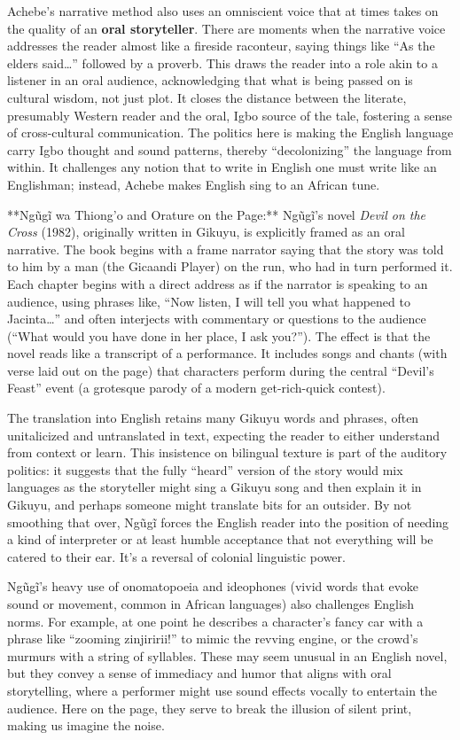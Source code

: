 \documentclass[12pt]{report}
\begin{document}
Achebe’s narrative method also uses an omniscient voice that at times takes on the quality of an \textbf{oral storyteller}. There are moments when the narrative voice addresses the reader almost like a fireside raconteur, saying things like “As the elders said…” followed by a proverb. This draws the reader into a role akin to a listener in an oral audience, acknowledging that what is being passed on is cultural wisdom, not just plot. It closes the distance between the literate, presumably Western reader and the oral, Igbo source of the tale, fostering a sense of cross-cultural communication. The politics here is making the English language carry Igbo thought and sound patterns, thereby “decolonizing” the language from within. It challenges any notion that to write in English one must write like an Englishman; instead, Achebe makes English sing to an African tune.

**Ngũgĩ wa Thiong’o and Orature on the Page:** Ngũgĩ’s novel \textit{Devil on the Cross} (1982), originally written in Gikuyu, is explicitly framed as an oral narrative. The book begins with a frame narrator saying that the story was told to him by a man (the Gicaandi Player) on the run, who had in turn performed it. Each chapter begins with a direct address as if the narrator is speaking to an audience, using phrases like, “Now listen, I will tell you what happened to Jacinta…” and often interjects with commentary or questions to the audience (“What would you have done in her place, I ask you?”). The effect is that the novel reads like a transcript of a performance. It includes songs and chants (with verse laid out on the page) that characters perform during the central “Devil’s Feast” event (a grotesque parody of a modern get-rich-quick contest). 

The translation into English retains many Gikuyu words and phrases, often unitalicized and untranslated in text, expecting the reader to either understand from context or learn. This insistence on bilingual texture is part of the auditory politics: it suggests that the fully “heard” version of the story would mix languages as the storyteller might sing a Gikuyu song and then explain it in Gikuyu, and perhaps someone might translate bits for an outsider. By not smoothing that over, Ngũgĩ forces the English reader into the position of needing a kind of interpreter or at least humble acceptance that not everything will be catered to their ear. It’s a reversal of colonial linguistic power.

Ngũgĩ’s heavy use of onomatopoeia and ideophones (vivid words that evoke sound or movement, common in African languages) also challenges English norms. For example, at one point he describes a character’s fancy car with a phrase like “zooming zinjiririi!” to mimic the revving engine, or the crowd’s murmurs with a string of syllables. These may seem unusual in an English novel, but they convey a sense of immediacy and humor that aligns with oral storytelling, where a performer might use sound effects vocally to entertain the audience. Here on the page, they serve to break the illusion of silent print, making us imagine the noise.
\end{document}
